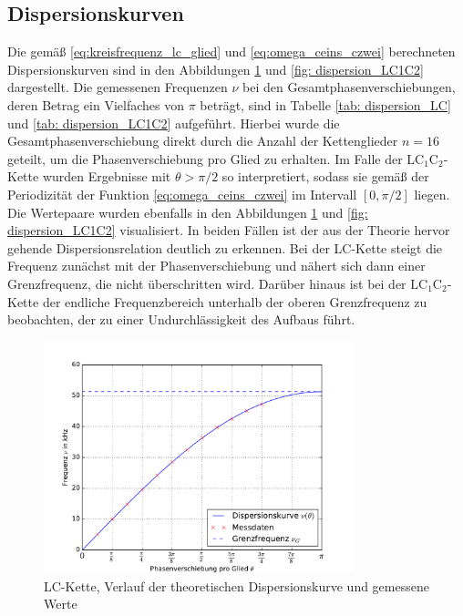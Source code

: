 \subsection{Dispersionskurven}
Die gemäß \eqref{eq:kreisfrequenz_lc_glied} und \eqref{eq:omega_ceins_czwei} berechneten Dispersionskurven sind in den Abbildungen \ref{fig: dispersion_LC} und \ref{fig: dispersion_LC1C2}
dargestellt. Die gemessenen Frequenzen $\nu$ bei den Gesamtphasenverschiebungen, deren Betrag ein Vielfaches von $\pi$ beträgt,
sind in Tabelle \ref{tab: dispersion_LC} und \ref{tab: dispersion_LC1C2} aufgeführt. Hierbei wurde die Gesamtphasenverschiebung direkt durch die
Anzahl der Kettenglieder $n = 16$ geteilt, um die Phasenverschiebung pro Glied zu erhalten. Im Falle der $\mathup{LC_1C_2}$-Kette
wurden Ergebnisse mit $\theta > \pi/2$ so interpretiert, sodass sie gemäß der Periodizität der Funktion \eqref{eq:omega_ceins_czwei} im Intervall
$[0, \pi/2]$ liegen. Die Wertepaare wurden ebenfalls in den Abbildungen \ref{fig: dispersion_LC} und \ref{fig: dispersion_LC1C2} visualisiert. In beiden Fällen
ist der aus der Theorie hervor gehende Dispersionsrelation deutlich zu erkennen. Bei der LC-Kette steigt die Frequenz zunächst mit der Phasenverschiebung und nähert
sich dann einer Grenzfrequenz, die nicht überschritten wird. Darüber hinaus ist bei der $\mathup{LC_1C_2}$-Kette der endliche Frequenzbereich unterhalb der oberen Grenzfrequenz
zu beobachten, der zu einer Undurchlässigkeit des Aufbaus führt.


\begin{figure}
  \centering
  \includegraphics[width = 0.8\textwidth]{../Messdaten/plots/dispersion.pdf}
  \caption{LC-Kette, Verlauf der theoretischen Dispersionskurve und gemessene Werte}
  \label{fig: dispersion_LC}
\end{figure}
